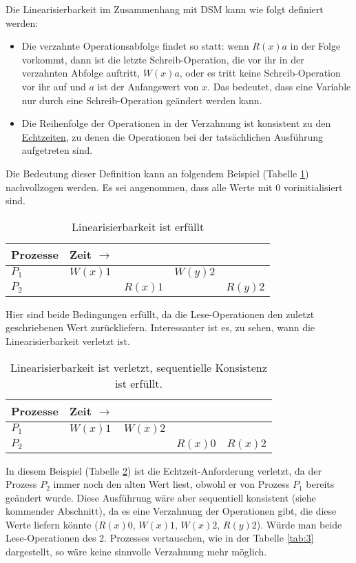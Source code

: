 Die Linearisierbarkeit im Zusammenhang mit DSM kann wie folgt definiert werden:
\begin{itemize}
	\item Die verzahnte Operationsabfolge findet so statt: wenn $R(x)a$ in der Folge vorkommt, dann ist die letzte Schreib-Operation, die vor ihr in der verzahnten Abfolge auftritt, $W(x)a$, oder es tritt keine Schreib-Operation vor ihr auf und $a$ ist der Anfangswert von $x$. Das bedeutet, dass eine Variable nur durch eine Schreib-Operation geändert werden kann.
	\item Die Reihenfolge der Operationen in der Verzahnung ist konsistent zu den \underline{Echtzeiten}, zu denen die Operationen bei der tatsächlichen Ausführung aufgetreten sind.
\end{itemize}

Die Bedeutung dieser Definition kann an folgendem Beispiel (Tabelle \ref{tab:1}) nachvollzogen werden. Es sei angenommen, dass alle Werte mit $0$ vorinitialisiert sind.

\begin{table}
	\centering
		\begin{tabular}{l | l l l l}
			\textbf{Prozesse} & \textbf{Zeit} $\rightarrow$ & \\
			\hline
			$P_{1}$ & $W(x)1$ & & $W(y)2$ \\
			$P_{2}$ & & $R(x)1$ & & $R(y)2$ \\
		\end{tabular}
	\caption{Linearisierbarkeit ist erfüllt}
	\label{tab:1}
\end{table}

Hier sind beide Bedingungen erfüllt, da die Lese-Operationen den zuletzt geschriebenen Wert zurückliefern. Interessanter ist es, zu sehen, wann die Linearisierbarkeit verletzt ist.

\begin{table}
	\centering
		\begin{tabular}{l | l l l l}
		\textbf{Prozesse} & \textbf{Zeit} $\rightarrow$ \\
		\hline
		$P_{1}$ & $W(x)1$ & $W(x)2$ \\
		$P_{2}$ & & & \color{red} $R(x)0$ & \color{black} $R(x)2$ \\
		\end{tabular}
	\caption{Linearisierbarkeit ist verletzt, sequentielle Konsistenz ist erfüllt.}
	\label{tab:2}
\end{table}

In diesem Beispiel (Tabelle \ref{tab:2}) ist die Echtzeit-Anforderung verletzt, da der Prozess $P_{2}$ immer noch den alten Wert liest, obwohl er von Prozess $P_{1}$ bereits geändert wurde. Diese Ausführung wäre aber sequentiell konsistent (siehe kommender Abschnitt), da es eine Verzahnung der Operationen gibt, die diese Werte liefern könnte ($R(x)0$, $W(x)1$, $W(x)2$, $R(y)2$). Würde man beide Lese-Operationen des 2. Prozesses vertauschen, wie in der Tabelle \ref{tab:3} dargestellt, so wäre keine sinnvolle Verzahnung mehr möglich.

